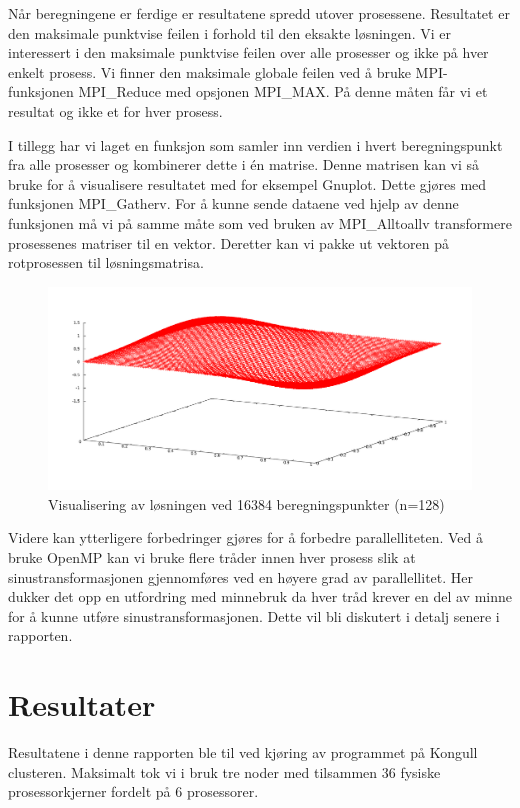 \documentclass[11pt,norsk,a4paper]{article}
\begin{document}
Når beregningene er ferdige er resultatene spredd utover prosessene. Resultatet er den maksimale punktvise feilen i forhold til den eksakte løsningen. Vi er interessert i den maksimale punktvise feilen over alle prosesser og ikke på hver enkelt prosess. Vi finner den maksimale globale feilen ved å bruke MPI-funksjonen MPI\_Reduce med opsjonen MPI\_MAX. På denne måten får vi et resultat og ikke et for hver prosess.

I tillegg har vi laget en funksjon som samler inn verdien i hvert beregningspunkt fra alle prosesser og kombinerer dette i én matrise. Denne matrisen kan vi så bruke for å visualisere resultatet med for eksempel Gnuplot\cite{gnuplot}. Dette gjøres med funksjonen MPI\_Gatherv. For å kunne sende dataene ved hjelp av denne funksjonen må vi på samme måte som ved bruken av MPI\_Alltoallv transformere prosessenes matriser til en vektor. Deretter kan vi pakke ut vektoren på rotprosessen til løsningsmatrisa.

\begin{figure}[h]
\centering
\includegraphics[scale=0.25]{plot_n128.png}
\caption{Visualisering av løsningen ved 16384 beregningspunkter (n=128)}
\end{figure}


Videre kan ytterligere forbedringer gjøres for å forbedre parallelliteten. Ved å bruke OpenMP\cite{MP} kan vi bruke flere tråder innen hver prosess slik at sinustransformasjonen gjennomføres ved en høyere grad av parallellitet. Her dukker det opp en utfordring med minnebruk da hver tråd krever en del av minne for å kunne utføre sinustransformasjonen. Dette vil bli diskutert i detalj senere i rapporten.

\section{Resultater}
Resultatene i denne rapporten ble til ved kjøring av programmet på Kongull clusteren\cite{kongull}. Maksimalt tok vi i bruk tre noder med tilsammen 36 fysiske prosessorkjerner fordelt på 6 prosessorer.
\end{document}
